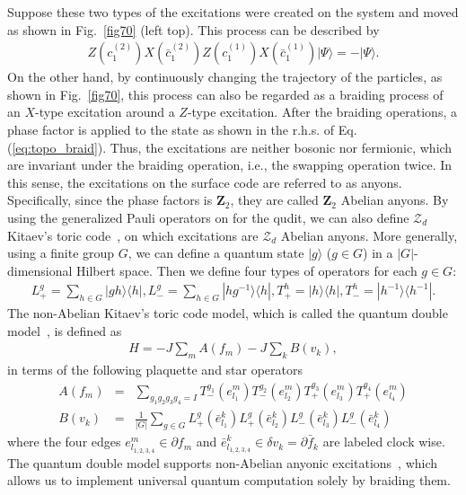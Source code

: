 Suppose these two types of the excitations were created on the system and moved as shown in Fig.~\ref{fig70} (left top).
This process can be described by
\begin{eqnarray}
Z(c_1^{(2)})X(\bar c_1^{(2)})Z(c_1^{(1)})X(\bar c_1^{(1)}) |\Psi \rangle =- |\Psi \rangle.
\label{eq:topo_braid}
\end{eqnarray}
On the other hand, by continuously changing the trajectory of the particles, as shown in Fig.~\ref{fig70}, this process can also be regarded as a braiding process of an $X$-type excitation around a $Z$-type excitation.
After the braiding operations, a phase factor is applied to the state
as shown in the r.h.s. of Eq. (\ref{eq:topo_braid}).
Thus, the excitations are neither bosonic nor fermionic, which are invariant under the braiding operation, i.e., the swapping operation twice.
In this sense, the excitations on the surface code are referred to as anyons.
Specifically, since the phase factors is $\mathbf{Z}_2$, 
they are called $\mathbf{Z}_2$ Abelian anyons.
By using the generalized Pauli operators
on for the qudit,
we can also define $\mathcal{Z}_d$ Kitaev's toric code~\cite{Kitaev},
on which excitations are $\mathcal{Z}_d$ Abelian anyons.
More generally, using a finite group $G$,
we can define a quantum state $|g\rangle$ ($g \in G$)
in a $|G|$-dimensional Hilbert space.
Then we define four types of operators for each $g \in G$:
\begin{eqnarray}
L^g_+ = \sum _{h \in G} |gh \rangle \langle h|,
L^g_- = \sum _{h \in G} |hg^{-1} \rangle \langle h|,
T_+^h= |h\rangle \langle h|,
T_-^h= |h^{-1}\rangle \langle h^{-1}|.
\end{eqnarray}
The non-Abelian Kitaev's toric code model,
which is called the quantum double model~\cite{Kitaev},
is defined as
\begin{eqnarray}
H=-J\sum _{m} A(f_m) -J \sum _{k} B(v_k),
\end{eqnarray}
in terms of
the following plaquette and star operators
\begin{eqnarray}
A(f_m) &=& \sum _{g_1 g_2 g_3 g_4 = I} T_-^{g_1}(e^m_{l_1})T_-^{g_2}(e^m_{l_2})
T_+^{g_3}(e^m_{l_3})T_+^{g_4}(e^m_{l_4})
\\
B(v_k) &=& \frac{1}{|G|}\sum _{g \in G} L_+^{g} (\bar e^k_{l_1})
L_+^{g}(\bar e^k_{l_2}) L_-^{g} (\bar e^k_{l_3}) L_-^{g} (\bar e^k_{l_4})
\end{eqnarray}
where the four edges $e^m_{l_{1,2,3,4}} \in \partial f_m$ 
and $\bar e^k_{l_{1,2,3,4}} \in 
\delta v_k = \partial \bar f _k$
are labeled clock wise.
The quantum double model
supports non-Abelian anyonic excitations~\cite{Kitaev,Pachos2012},
which allows us to implement universal quantum computation 
solely by braiding them.

